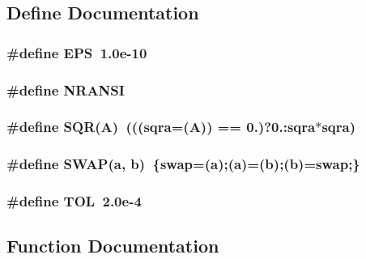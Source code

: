 \subsection{Define Documentation}
\subsubsection{\setlength{\rightskip}{0pt plus 5cm}\#define EPS~1.0e-10}\label{nrminmd_8c_6ebf6899d6c1c8b7b9d09be872c05aae}


\subsubsection{\setlength{\rightskip}{0pt plus 5cm}\#define NRANSI}\label{nrminmd_8c_c35ec264c922c9b83f2b3d79cb8f5d93}


\subsubsection{\setlength{\rightskip}{0pt plus 5cm}\#define SQR(A)~((({\bf sqra}=(A)) == 0.)?0.:{\bf sqra}$\ast${\bf sqra})}\label{nrminmd_8c_a6604d165d6a0e3fef3654e08d69cdf9}


\subsubsection{\setlength{\rightskip}{0pt plus 5cm}\#define SWAP(a, b)~\{swap=(a);(a)=(b);(b)=swap;\}}\label{nrminmd_8c_ac9153aee4bdb92701df902e06a74eb3}


\subsubsection{\setlength{\rightskip}{0pt plus 5cm}\#define TOL~2.0e-4}\label{nrminmd_8c_156b862ebf6d213f5da19b9e3ccb779e}




\subsection{Function Documentation}

